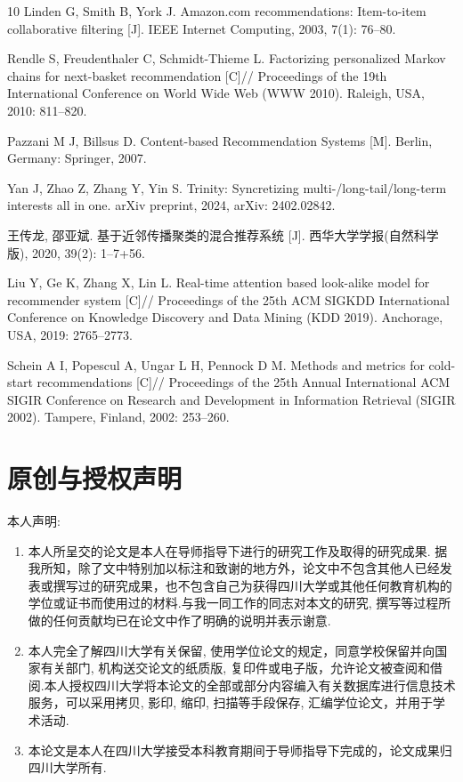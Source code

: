 \documentclass[a4paper, AutoFakeBold, UTF8]{ctexrep}
\theoremstyle{plain}
\numberwithin{equation}{chapter}
\begin{document}
\begin{thebibliography}{10}
Linden G, Smith B, York J. Amazon.com recommendations: Item-to-item collaborative filtering [J]. IEEE Internet Computing, 2003, 7(1): 76--80.

Rendle S, Freudenthaler C, Schmidt-Thieme L. Factorizing personalized Markov chains for next-basket recommendation [C]// Proceedings of the 19th International Conference on World Wide Web (WWW 2010). Raleigh, USA, 2010: 811--820.

Pazzani M J, Billsus D. Content-based Recommendation Systems [M]. Berlin, Germany: Springer, 2007.

Yan J, Zhao Z, Zhang Y, Yin S. Trinity: Syncretizing multi-/long-tail/long-term interests all in one. arXiv preprint, 2024, arXiv: 2402.02842.


王传龙, 邵亚斌. 基于近邻传播聚类的混合推荐系统 [J]. 西华大学学报(自然科学版), 2020, 39(2): 1--7+56.

Liu Y, Ge K, Zhang X, Lin L. Real-time attention based look-alike model for recommender system [C]// Proceedings of the 25th ACM SIGKDD International Conference on Knowledge Discovery and Data Mining (KDD 2019). Anchorage, USA, 2019: 2765--2773.

Schein A I, Popescul A, Ungar L H, Pennock D M. Methods and metrics for cold-start recommendations [C]// Proceedings of the 25th Annual International ACM SIGIR Conference on Research and Development in Information Retrieval (SIGIR 2002). Tampere, Finland, 2002: 253--260.

\end{thebibliography}

\clearpage
{}
{}
\chapter*{原创与授权声明}

\vskip 0.25cm

本人声明: 
\begin{enumerate}
	\item 本人所呈交的论文是本人在导师指导下进行的研究工作及取得的研究成果. 据我所知，除了文中特别加以标注和致谢的地方外，论文中不包含其他人已经发表或撰写过的研究成果，也不包含自己为获得四川大学或其他任何教育机构的学位或证书而使用过的材料.与我一同工作的同志对本文的研究, 撰写等过程所做的任何贡献均已在论文中作了明确的说明并表示谢意.
	
	\item 本人完全了解四川大学有关保留, 使用学位论文的规定，同意学校保留并向国家有关部门, 机构送交论文的纸质版, 复印件或电子版，允许论文被查阅和借阅.本人授权四川大学将本论文的全部或部分内容编入有关数据库进行信息技术服务，可以采用拷贝, 影印, 缩印, 扫描等手段保存, 汇编学位论文，并用于学术活动.%
	
	\item 本论文是本人在四川大学接受本科教育期间于导师指导下完成的，论文成果归四川大学所有.
\end{enumerate}
\end{document}
